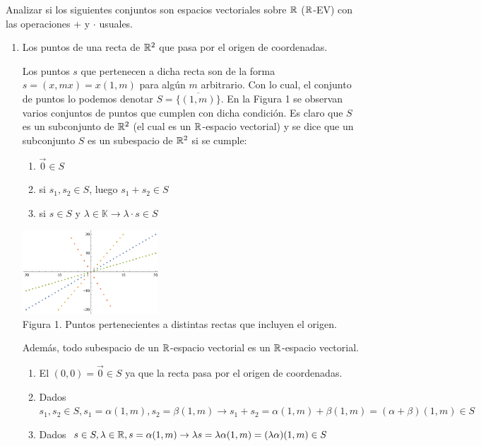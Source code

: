 \item Analizar si los siguientes conjuntos son espacios vectoriales sobre $\mathbb{R}$ ($\mathbb{R}$-EV) con las operaciones + y $\cdot$ usuales.
    \begin{enumerate}
        \item Los puntos de una recta de $\mathbb{R}^2$ que pasa por el origen de coordenadas.
            \begin{mdframed}[style=s]
                Los puntos $s$ que pertenecen a dicha recta son de la forma $s=(x,mx)=x(1,m)$ para algún $m$ arbitrario. Con lo cual, el conjunto de puntos lo podemos denotar $S=\overline{\{(1,m)\}}$. En la Figura 1 se observan varios conjuntos de puntos que cumplen con dicha condición. Es claro que $S$ es un subconjunto de $\mathbb{R}^2$ (el cual es un $\mathbb{R}$-espacio vectorial) y se dice que un subconjunto $S$ es un subespacio de $\mathbb{R}^2$ si se cumple:
                \begin{enumerate}
                    \item $\vec{0}\in S$
                    \item si $s_1,s_2 \in S$, luego $s_1+s_2\in S$
                    \item si $s\in S$ y $\lambda \in \mathbb{K} \to \lambda \cdot s \in S$
                \end{enumerate}
                \begin{center}
                    \includegraphics[width=0.4\textwidth]{Ej1a.png}\\
                    Figura 1. Puntos pertenecientes a distintas rectas que incluyen el origen.
                \end{center}
                Además, todo subespacio de un $\mathbb{R}$-espacio vectorial es un $\mathbb{R}$-espacio vectorial.
                \begin{enumerate}
                    \item El $(0,0)=\vec{0}\in S$ ya que la recta pasa por el origen de coordenadas.
                    \item Dados $s_1,s_2\in S, s_1=\alpha(1,m), s_2=\beta(1,m)\to s_1+s_2=\alpha(1,m)+\beta(1,m)=(\alpha + \beta)(1,m)\in S$
                    \item Dados $s\in S, \lambda \in \mathbb{R}, s=\alpha(1,m)\to \lambda s=\lambda\alpha(1,m)=(\lambda\alpha)(1,m)\in S$

\end{enumerate}
\end{mdframed}
\end{enumerate}
